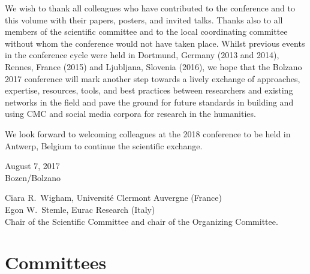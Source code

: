 \documentclass[a4paper, onesided]{easychair}
\begin{document}
We wish to thank all colleagues who have contributed to the conference and to this volume with their papers, posters, and invited talks. Thanks also to all members of the scientific committee and to the local coordinating committee without whom the conference would not have taken place. Whilst previous events in the conference cycle were held in Dortmund, Germany (2013 and 2014), Rennes, France (2015) and Ljubljana, Slovenia (2016), we hope that the Bolzano 2017 conference will mark another step towards a lively exchange of approaches, expertise, resources, tools, and best practices between researchers and existing networks in the field and pave the ground for future standards in building and using CMC and social media corpora for research in the humanities.

We look forward to welcoming colleagues at the 2018 conference to be held in Antwerp, Belgium to continue the scientific exchange.
\bigskip

\noindent
\begin{minipage}[t]{.2\textwidth}
    August 7, 2017\\
    Bozen/Bolzano
\end{minipage}%
\hfill
\begin{minipage}[t]{.75\textwidth}\flushright
    Ciara R.~Wigham, Universit\'e Clermont Auvergne (France)\\
    Egon W.~Stemle, Eurac Research (Italy)\\
    \medskip
    Chair of the Scientific Committee and chair of the Organizing Committee.
\end{minipage}
\thispagestyle{plain}
\clearpage



\clearpage
\pagestyle{plain}
\renewcommand\contentsname{Table of Contents}
{}
\tableofcontents
\clearpage

\clearpage
\pagestyle{plain}
\section*{Committees}
%

\bigskip
\end{document}
